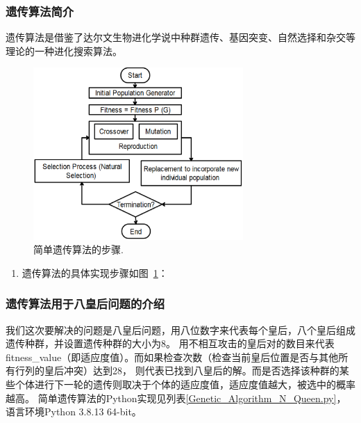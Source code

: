 \documentclass[12pt,a4paper,UTF8]{ctexart}
\begin{document}
\subsubsection{遗传算法简介}
遗传算法是借鉴了达尔文生物进化学说中种群遗传、基因突变、自然选择和杂交等理论的一种进化搜索算法。
\begin{figure}[htbp]
    \centering
    \includegraphics[width=8cm]{allpicture/alsxf-vpg1i.eps}
    \caption{简单遗传算法的步骤\cite{pandeyGeneticAlgorithmsConcepts2012}.}
    \label{fig:遗传算法的步骤}
\end{figure}
\begin{enumerate}
    \item 遗传算法的具体实现步骤如图~\ref{fig:遗传算法的步骤}：
\end{enumerate}
\subsubsection{遗传算法用于八皇后问题的介绍}
我们这次要解决的问题是八皇后问题，用八位数字来代表每个皇后，八个皇后组成遗传种群，并设置遗传种群的大小为8。
用不相互攻击的皇后对的数目来代表fitness\_value（即适应度值）。而如果检查次数（检查当前皇后位置是否与其他所有行列的皇后冲突）达到28，
则代表已找到八皇后的解。而是否选择该种群的某些个体进行下一轮的遗传则取决于个体的适应度值，适应度值越大，被选中的概率越高。
简单遗传算法的Python实现见列表\ref{Genetic_Algorithm_N_Queen.py}，语言环境Python 3.8.13 64-bit。

\end{document}

